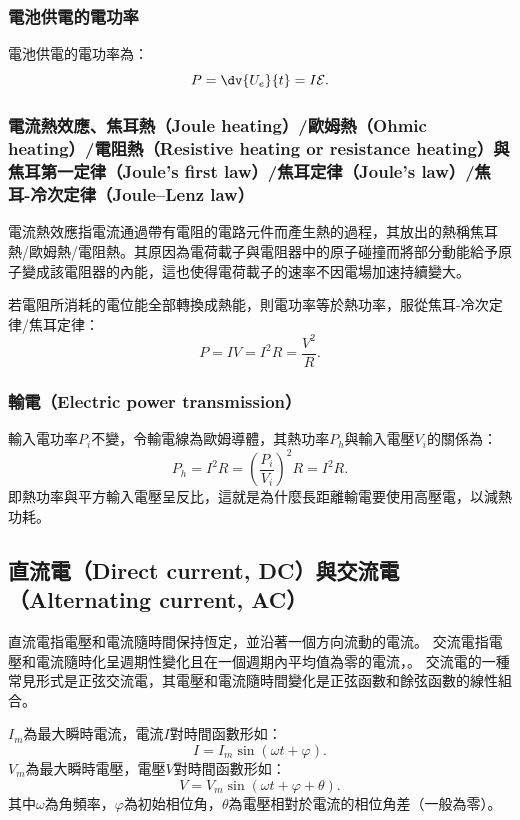 \documentclass[a4paper,12pt]{report}
\begin{document}
\begin{itemize}
\subsubsection{電池供電的電功率}
電池供電的電功率為：
\[P=\dv{U_e}{t}=I\mathcal{E}.\]
\subsubsection{電流熱效應、焦耳熱（Joule heating）/歐姆熱（Ohmic heating）/電阻熱（Resistive heating or resistance heating）與焦耳第一定律（Joule's first law）/焦耳定律（Joule's law）/焦耳-冷次定律（Joule–Lenz law）}
電流熱效應指電流通過帶有電阻的電路元件而產生熱的過程，其放出的熱稱焦耳熱/歐姆熱/電阻熱。其原因為電荷載子與電阻器中的原子碰撞而將部分動能給予原子變成該電阻器的內能，這也使得電荷載子的速率不因電場加速持續變大。

若電阻所消耗的電位能全部轉換成熱能，則電功率等於熱功率，服從焦耳-冷次定律/焦耳定律：
\[P=IV=I^2R=\frac{V^2}{R}.\]
\subsubsection{輸電（Electric power transmission）}
輸入電功率$P_i$不變，令輸電線為歐姆導體，其熱功率$P_h$與輸入電壓$V_i$的關係為：
\[P_h=I^2R=\left(\frac{P_i}{V_i}\right)^2R=I^2R.\]
即熱功率與平方輸入電壓呈反比，這就是為什麼長距離輸電要使用高壓電，以減熱功耗。
\subsection{直流電（Direct current, DC）與交流電（Alternating current, AC）}
直流電指電壓和電流隨時間保持恆定，並沿著一個方向流動的電流。
交流電指電壓和電流隨時化呈週期性變化且在一個週期內平均值為零的電流，。
交流電的一種常見形式是正弦交流電，其電壓和電流隨時間變化是正弦函數和餘弦函數的線性組合。

$I_m$為最大瞬時電流，電流$I$對時間函數形如：
\[I=I_m\sin(\omega t+\varphi).\]
$V_m$為最大瞬時電壓，電壓$V$對時間函數形如：
\[V=V_m\sin(\omega t+\varphi+\theta).\]
其中$\omega$為角頻率，$\varphi$為初始相位角，$\theta$為電壓相對於電流的相位角差（一般為零）。


\end{itemize}
\end{document}
